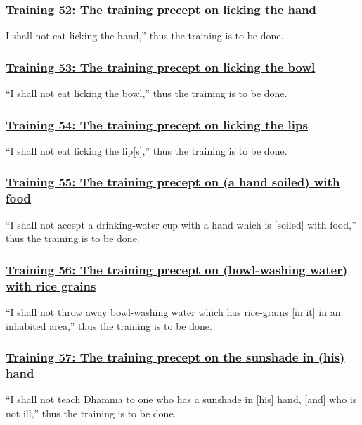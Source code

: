 \subsubsection*{\hyperref[sekh52]{Training 52: The training precept on licking the hand}}
\label{training52}
I shall not eat licking the hand,'' thus the training is to be done.

\subsubsection*{\hyperref[sekh53]{Training 53: The training precept on licking the bowl}}
\label{training53}
``I shall not eat licking the bowl,'' thus the training is to be done.

\subsubsection*{\hyperref[sekh54]{Training 54: The training precept on licking the lips}}
\label{training54}
``I shall not eat licking the lip[s],'' thus the training is to be done.

\subsubsection*{\hyperref[sekh55]{Training 55: The training precept on (a hand soiled) with food}}
\label{training55}
``I shall not accept a drinking-water cup with a hand which is [soiled] with food,'' thus the training is to be done.

\subsubsection*{\hyperref[sekh56]{Training 56: The training precept on (bowl-washing water) with rice grains}}
\label{training56}
``I shall not throw away bowl-washing water which has rice-grains [in it] in an inhabited area,'' thus the training is to be done.

\subsubsection*{\hyperref[sekh57]{Training 57: The training precept on the sunshade in (his) hand}}
\label{training57}
``I shall not teach Dhamma to one who has a sunshade in [his] hand, [and] who is not ill,'' thus the training is to be done.

